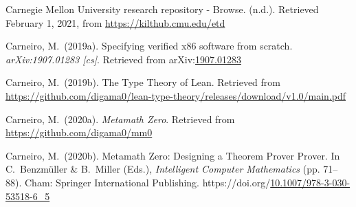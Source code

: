 \documentclass[12pt,twoside]{article}
\begin{document}
{\begin{thebibliography}{1079}
\mdbibitemlabel{}Carnegie Mellon University research repository - Browse. (n.d.). Retrieved February 1, 2021, from \href{https://kilthub.cmu.edu/etd}{{\ttfamily https://\hspace{0pt}kilthub.\hspace{0pt}cmu.\hspace{0pt}edu/\hspace{0pt}etd}}%

\mdbibitemlabel{}Carneiro, M.~(2019a). Specifying verified x86 software from scratch. \emph{arXiv:1907.01283 {}[cs]}. Retrieved from arXiv:\href{http://arxiv.org/abs/1907.01283}{1907.01283}%

\mdbibitemlabel{}Carneiro, M.~(2019b). The Type Theory of Lean. Retrieved from \href{https://github.com/digama0/lean-type-theory/releases/download/v1.0/main.pdf}{{\ttfamily https://\hspace{0pt}github.\hspace{0pt}com/\hspace{0pt}digama0/\hspace{0pt}lean-\hspace{0pt}type-\hspace{0pt}theory/\hspace{0pt}releases/\hspace{0pt}download/\hspace{0pt}v1.\hspace{0pt}0/\hspace{0pt}main.\hspace{0pt}pdf}}%

\mdbibitemlabel{}Carneiro, M.~(2020a). \emph{Metamath Zero}. Retrieved from \href{https://github.com/digama0/mm0}{{\ttfamily https://\hspace{0pt}github.\hspace{0pt}com/\hspace{0pt}digama0/\hspace{0pt}mm0}}%

\mdbibitemlabel{}Carneiro, M.~(2020b). Metamath Zero: Designing a Theorem Prover Prover. In C.~Benzmüller \& B.~Miller (Eds.), \emph{Intelligent Computer Mathematics} (pp. 71–88). Cham: Springer International Publishing. https://doi.org/\href{https://dx.doi.org/10.1007/978-3-030-53518-6_5}{10.1007/978-3-030-53518-6\_5}%


\end{thebibliography}}
\end{document}
